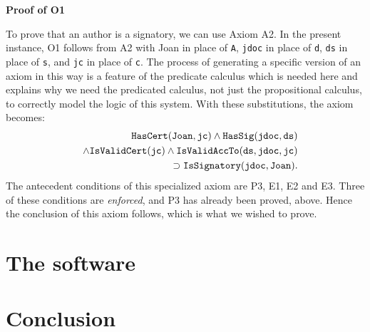 {\bf Proof of O1}

To prove that an author is a signatory, we can use Axiom A2. In the present instance, O1 follows
from A2 with Joan in place of {\tt A}, {\tt jdoc} in place of {\tt d}, 
{\tt ds} in place of {\tt s}, and {\tt jc} in place of {\tt c}.
The process of generating a specific version of an axiom in this way
is a feature of the predicate calculus which is needed here and explains
why we need the predicated calculus, not just the propositional calculus,
to correctly model the logic of this system. With these substitutions,
the axiom becomes:
\begin{eqnarray}\label{A2specific}\nonumber
&&\hbox{\tt HasCert}({\tt Joan},{\tt jc}) \wedge \hbox{\tt HasSig}({\tt jdoc},{\tt ds}) \\ \nonumber
&&\wedge \hbox{\tt IsValidCert}({\tt jc}) 
\wedge {\tt IsValidAccTo}({\tt ds},{\tt jdoc},{\tt jc}) \\ \nonumber
&&\supset \hbox{\tt IsSignatory}({\tt jdoc},{\tt Joan}).
\end{eqnarray}
The antecedent conditions of this specialized axiom are
P3, E1, E2 and E3. Three of these conditions are {\em enforced}, and P3 has
already been proved, above. Hence the conclusion of this axiom follows, which
is what we wished to prove.

\section{The software}\label{swinfgrahp}
\section{Conclusion}\label{concch5}

